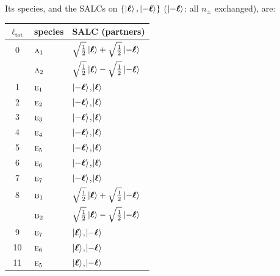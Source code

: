 \documentclass[11pt]{article}
\newcommand{\irr}[1]{\text{\normalfont\scshape #1}}
\begin{document}
Its species, and the SALCs on $\{\ket{\boldsymbol\ell},\ket{-\boldsymbol\ell}\}$ ($\ket{-\boldsymbol\ell}$: all $n_\pm$ exchanged), are:

\begin{longtable}{c l l}\hline $\ell_{\mathrm{tot}}$ & species & SALC (partners)\\ \hline\endhead

0 & $\irr{a}_{1}$ & $\sqrt{\tfrac{1}{2}}\ket{\boldsymbol\ell}+\sqrt{\tfrac{1}{2}}\ket{-\boldsymbol\ell}$\\

 & $\irr{a}_{2}$ & $\sqrt{\tfrac{1}{2}}\ket{\boldsymbol\ell}-\sqrt{\tfrac{1}{2}}\ket{-\boldsymbol\ell}$\\

1 & $\irr{e}_{1}$ & $\ket{-\boldsymbol\ell}$,\quad $\ket{\boldsymbol\ell}$\\

2 & $\irr{e}_{2}$ & $\ket{-\boldsymbol\ell}$,\quad $\ket{\boldsymbol\ell}$\\

3 & $\irr{e}_{3}$ & $\ket{-\boldsymbol\ell}$,\quad $\ket{\boldsymbol\ell}$\\

4 & $\irr{e}_{4}$ & $\ket{-\boldsymbol\ell}$,\quad $\ket{\boldsymbol\ell}$\\

5 & $\irr{e}_{5}$ & $\ket{-\boldsymbol\ell}$,\quad $\ket{\boldsymbol\ell}$\\

6 & $\irr{e}_{6}$ & $\ket{-\boldsymbol\ell}$,\quad $\ket{\boldsymbol\ell}$\\

7 & $\irr{e}_{7}$ & $\ket{-\boldsymbol\ell}$,\quad $\ket{\boldsymbol\ell}$\\

8 & $\irr{b}_{1}$ & $\sqrt{\tfrac{1}{2}}\ket{\boldsymbol\ell}+\sqrt{\tfrac{1}{2}}\ket{-\boldsymbol\ell}$\\

 & $\irr{b}_{2}$ & $\sqrt{\tfrac{1}{2}}\ket{\boldsymbol\ell}-\sqrt{\tfrac{1}{2}}\ket{-\boldsymbol\ell}$\\

9 & $\irr{e}_{7}$ & $\ket{\boldsymbol\ell}$,\quad $\ket{-\boldsymbol\ell}$\\

10 & $\irr{e}_{6}$ & $\ket{\boldsymbol\ell}$,\quad $\ket{-\boldsymbol\ell}$\\

11 & $\irr{e}_{5}$ & $\ket{\boldsymbol\ell}$,\quad $\ket{-\boldsymbol\ell}$\\


\end{longtable}
\end{document}

